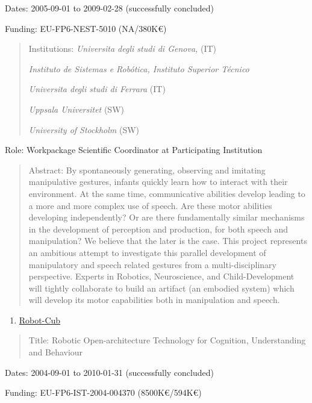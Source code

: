Dates: 2005-09-01 to 2009-02-28 (successfully concluded)

Funding: EU-FP6-NEST-5010 (NA/380K€)

\begin{quote}
Institutions: \emph{Universita degli studi di Genova,} (IT)

\emph{Instituto de Sistemas e Robótica, Instituto Superior Técnico}

\emph{Universita degli studi di Ferrara} (IT)

\emph{Uppsala Universitet} (SW)

\emph{University of Stockholm} (SW)
\end{quote}

Role: Workpackage Scientific Coordinator at Participating Institution

\begin{quote}
Abstract: By spontaneously generating, observing and imitating
manipulative gestures, infants quickly learn how to interact with their
environment. At the same time, communicative abilities develop leading
to a more and more complex use of speech. Are these motor abilities
developing independently? Or are there fundamentally similar mechanisms
in the development of perception and production, for both speech and
manipulation? We believe that the later is the case. This project
represents an ambitious attempt to investigate this parallel development
of manipulatory and speech related gestures from a multi-disciplinary
perspective. Experts in Robotics, Neuroscience, and Child-Development
will tightly collaborate to build an artifact (an embodied system) which
will develop its motor capabilities both in manipulation and speech.
\end{quote}

\begin{enumerate}
\def\labelenumi{\arabic{enumi}.}
\setcounter{enumi}{14}
\item
  \ul{Robot-Cub}
\end{enumerate}

\begin{quote}
Title: Robotic Open-architecture Technology for Cognition, Understanding
and Behaviour
\end{quote}

Dates: 2004-09-01 to 2010-01-31 (successfully concluded)

Funding: EU-FP6-IST-2004-004370 (8500K€/594K€)

